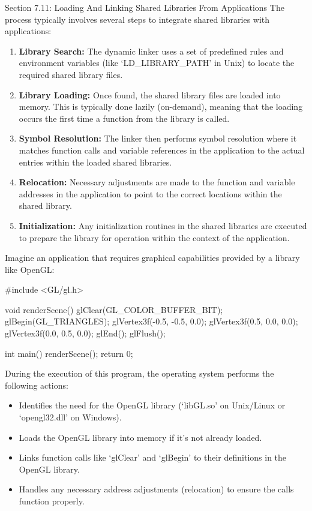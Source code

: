 \begin{notes}{Section 7.11: Loading And Linking Shared Libraries From Applications}
    The process typically involves several steps to integrate shared libraries with applications:
    \begin{enumerate}
        \item \textbf{Library Search:} The dynamic linker uses a set of predefined rules and environment variables (like `LD\_LIBRARY\_PATH' in Unix) to locate the required shared library files.
        \item \textbf{Library Loading:} Once found, the shared library files are loaded into memory. This is typically done lazily (on-demand), meaning that the loading occurs the first time a 
        function from the library is called.
        \item \textbf{Symbol Resolution:} The linker then performs symbol resolution where it matches function calls and variable references in the application to the actual entries within the 
        loaded shared libraries.
        \item \textbf{Relocation:} Necessary adjustments are made to the function and variable addresses in the application to point to the correct locations within the shared library.
        \item \textbf{Initialization:} Any initialization routines in the shared libraries are executed to prepare the library for operation within the context of the application.
    \end{enumerate}
    
    \begin{highlight}
        Imagine an application that requires graphical capabilities provided by a library like OpenGL:
        \begin{code}[C]
        #include <GL/gl.h>
    
        void renderScene() {
            glClear(GL_COLOR_BUFFER_BIT);
            glBegin(GL_TRIANGLES);
                glVertex3f(-0.5, -0.5, 0.0);
                glVertex3f(0.5, 0.0, 0.0);
                glVertex3f(0.0, 0.5, 0.0);
            glEnd();
            glFlush();
        }
    
        int main() {
            renderScene();
            return 0;
        }
        \end{code}
        During the execution of this program, the operating system performs the following actions:
        \begin{itemize}
            \item Identifies the need for the OpenGL library (`libGL.so' on Unix/Linux or `opengl32.dll' on Windows).
            \item Loads the OpenGL library into memory if it's not already loaded.
            \item Links function calls like `glClear' and `glBegin' to their definitions in the OpenGL library.
            \item Handles any necessary address adjustments (relocation) to ensure the calls function properly.
        \end{itemize}
    \end{highlight}
    

\end{notes}
